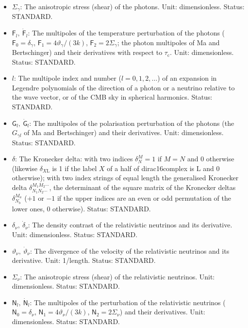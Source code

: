 \documentclass[
  10pt,
]{article}
\begin{document}
\begin{itemize}
\item
  \(\Sigma_\gamma\): The anisotropic stress (shear) of the photons.
  Unit: dimensionless. Status: STANDARD.
\item
  \(\mathsf{F}_l,\ \dot{\mathsf{F}}_l\): The multipoles of the
  temperature perturbation of the photons
  (\(\mathsf{F}_0 = \delta_\gamma\),
  \(\mathsf{F}_1 = 4\vartheta_\gamma/(3k)\),
  \(\mathsf{F}_2 = 2\Sigma_\gamma\); the photon multipoles of Ma and
  Bertschinger) and their derivatives with respect to
  \(\tau_{\mathrm{c}}\). Unit: dimensionless. Status: STANDARD.
\item
  \(l\): The multipole index and number (\(l = 0, 1, 2, \dots\)) of an
  expansion in Legendre polynomials of the direction of a photon or a
  neutrino relative to the wave vector, or of the CMB sky in spherical
  harmonics. Status: STANDARD.
\item
  \(\mathsf{G}_l,\ \dot{\mathsf{G}}_l\): The multipoles of the
  polarisation perturbation of the photons (the \(G_{\gamma l}\) of Ma
  and Bertschinger) and their derivatives. Unit: dimensionless. Status:
  STANDARD.
\item
  \(\delta\): The Kronecker delta: with two indices \(\delta^M_N = 1\)
  if \(M = N\) and 0 otherwise (likewise \(\delta_{X\mathrm{L}}\) is 1
  if the label \(X\) of a half of dirac16complex is L and 0 otherwise);
  with two index strings of equal length the generalised Kronecker delta
  \(\delta^{M_1M_2\cdots}_{N_1N_2\cdots}\), the determinant of the
  square matrix of the Kronecker deltas \(\delta^{M_a}_{N_b}\) (\(+1\)
  or \(-1\) if the upper indices are an even or odd permutation of the
  lower ones, 0 otherwise). Status: STANDARD.
\item
  \(\delta_\nu,\ \dot\delta_\nu\): The density contrast of the
  relativistic neutrinos and its derivative. Unit: dimensionless.
  Status: STANDARD.
\item
  \(\vartheta_\nu,\ \dot\vartheta_\nu\): The divergence of the velocity
  of the relativistic neutrinos and its derivative. Unit: 1/length.
  Status: STANDARD.
\item
  \(\Sigma_\nu\): The anisotropic stress (shear) of the relativistic
  neutrinos. Unit: dimensionless. Status: STANDARD.
\item
  \(\mathsf{N}_l,\ \dot{\mathsf{N}}_l\): The multipoles of the
  perturbation of the relativistic neutrinos
  (\(\mathsf{N}_0 = \delta_\nu\),
  \(\mathsf{N}_1 = 4\vartheta_\nu/(3k)\),
  \(\mathsf{N}_2 = 2\Sigma_\nu\)) and their derivatives. Unit:
  dimensionless. Status: STANDARD.

\end{itemize}
\end{document}
